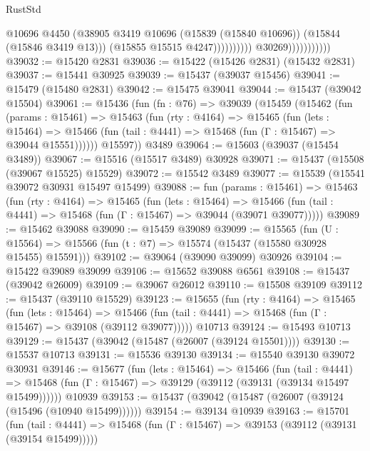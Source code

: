 \begin{lexlean}{RustStd}
\begin{coremodule}
                                            @10696
                                            @4450
                                            (@38905
                                              @3419
                                              @10696
                                              (@15839 (@15840 @10696))
                                              (@15844 (@15846 @3419 @13)))
                                            (@15855 @15515 @4247))))))))))
                          @30269)))))))))))
@39032 := @15420 @2831
@39036 := @15422 (@15426 @2831) (@15432 @2831)
@39037 := @15441 @30925
@39039 := @15437 (@39037 @15456)
@39041 := @15479 (@15480 @2831)
@39042 := @15475 @39041
@39044 := @15437 (@39042 @15504)
@39061 := @15436
    (fun (fn : @76) =>
    @39039
      (@15459
        (@15462
          (fun (params : @15461) =>
          @15463
            (fun (rty : @4164) =>
            @15465
              (fun (lets : @15464) =>
              @15466 (fun (tail : @4441) => @15468 (fun (Γ : @15467) => @39044 @15551))))))
        @15597))
    @3489
@39064 := @15603 (@39037 (@15454 @3489))
@39067 := @15516 (@15517 @3489) @30928
@39071 := @15437 (@15508 (@39067 @15525) @15529)
@39072 := @15542 @3489
@39077 := @15539 (@15541 @39072 @30931 @15497 @15499)
@39088 := fun (params : @15461) =>
  @15463
    (fun (rty : @4164) =>
    @15465
      (fun (lets : @15464) =>
      @15466 (fun (tail : @4441) => @15468 (fun (Γ : @15467) => @39044 (@39071 @39077)))))
@39089 := @15462 @39088
@39090 := @15459 @39089
@39099 := @15565
    (fun (U : @15564) => @15566 (fun (t : @7) => @15574 (@15437 (@15580 @30928 @15455) @15591)))
@39102 := @39064 (@39090 @39099) @30926
@39104 := @15422 @39089 @39099
@39106 := @15652 @39088 @6561
@39108 := @15437 (@39042 @26009)
@39109 := @39067 @26012
@39110 := @15508 @39109
@39112 := @15437 (@39110 @15529)
@39123 := @15655
    (fun (rty : @4164) =>
    @15465
      (fun (lets : @15464) =>
      @15466 (fun (tail : @4441) => @15468 (fun (Γ : @15467) => @39108 (@39112 @39077)))))
    @10713
@39124 := @15493 @10713
@39129 := @15437 (@39042 (@15487 (@26007 (@39124 @15501))))
@39130 := @15537 @10713
@39131 := @15536 @39130
@39134 := @15540 @39130 @39072 @30931
@39146 := @15677
    (fun (lets : @15464) =>
    @15466
      (fun (tail : @4441) =>
      @15468 (fun (Γ : @15467) => @39129 (@39112 (@39131 (@39134 @15497 @15499))))))
    @10939
@39153 := @15437 (@39042 (@15487 (@26007 (@39124 (@15496 (@10940 @15499))))))
@39154 := @39134 @10939
@39163 := @15701
    (fun (tail : @4441) => @15468 (fun (Γ : @15467) => @39153 (@39112 (@39131 (@39154 @15499)))))

\end{coremodule}
\end{lexlean}
